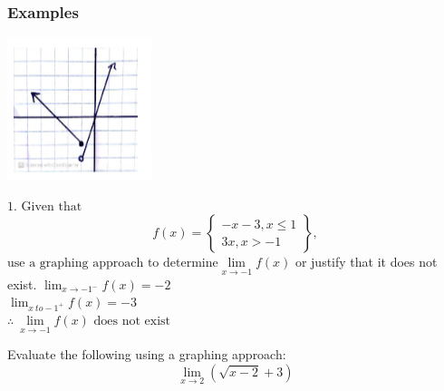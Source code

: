 \documentclass{article}
\begin{document}
\subsubsection*{Examples}
\begin{minipage}{0.35\textwidth}
    \includegraphics[width=\textwidth]{imgs/ex1.png}
\end{minipage}
\hspace{0.05\textwidth}
\begin{minipage}{0.6\textwidth}
    $\text{1. Given that}$
    $$f(x)=\left\{\begin{array}{c}
    -x-3, x \leq 1 \\
    3 x, x>-1
    \end{array}\right\},$$
    $\text{use a graphing approach to determine} \lim\limits_{x \to -1} f(x)$ or justify that it does not exist.
    $\lim_{x \to -1^-}f(x)=-2$\\
    $\lim_{x\ to -1^+}f(x)=-3$\\
   $\boxed{\therefore\ \lim\limits_{x \to -1} f(x)\text{ does not exist}}$
    \vspace{1cm}
\end{minipage}
Evaluate the following using a graphing approach:
\[
\lim_{x \to 2}\left(\sqrt{x-2}+3\right)
\]
\noindent
\begin{minipage}[t]{0.5\textwidth}
    \vspace{0pt}
\end{minipage}
\end{document}
